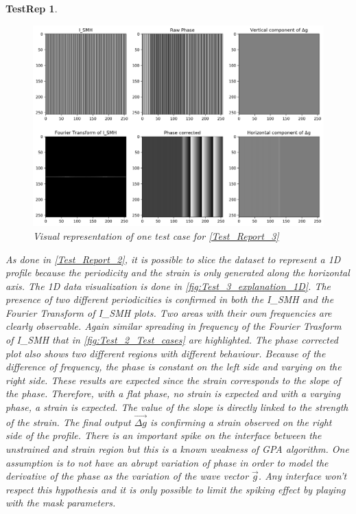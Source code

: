 \documentclass[12pt, titlepage]{article}
\newtheorem{TestRep}{TestRep}
\begin{document}
\begin{TestRep}
\begin{figure}[H]
\begin{center}
\includegraphics[scale=0.5]{Figures/Test_3_explanation.png}
\caption{Visual representation of one test case for \cref{Test_Report_3}}
\label{fig:Test_3_explanation}
\end{center}
\end{figure}

As done in \cref{Test_Report_2}, it is possible to slice the dataset to represent a 1D profile because the periodicity and the strain is only generated along the horizontal axis. The 1D data visualization is done in \cref{fig:Test_3_explanation_1D}. The presence of two different periodicities is confirmed in both the I{\_}SMH and the Fourier Transform of I{\_}SMH plots. Two areas with their own frequencies are clearly observable. Again similar spreading in frequency of the Fourier Trasform of I{\_}SMH that in \cref{fig:Test_2_Test_cases} are highlighted. The phase corrected plot also shows two different regions with different behaviour. Because of the difference of frequency, the phase is constant on the left side and varying on the right side. These results are expected since the strain corresponds to the slope of the phase. Therefore, with a flat phase, no strain is expected and with a varying phase, a strain is expected. The value of the slope is directly linked to the strength of the strain. The final output $\overrightarrow{\Delta g}$ is confirming a strain observed on the right side of the profile. There is an important spike on the interface between the unstrained and strain region but this is a known weakness of GPA algorithm. One assumption is to not have an abrupt variation of phase in order to model the derivative of the phase as the variation of the wave vector $\overrightarrow{g}$. Any interface won't respect this hypothesis and it is only possible to limit the spiking effect by playing with the mask parameters.


\end{TestRep}
\end{document}

